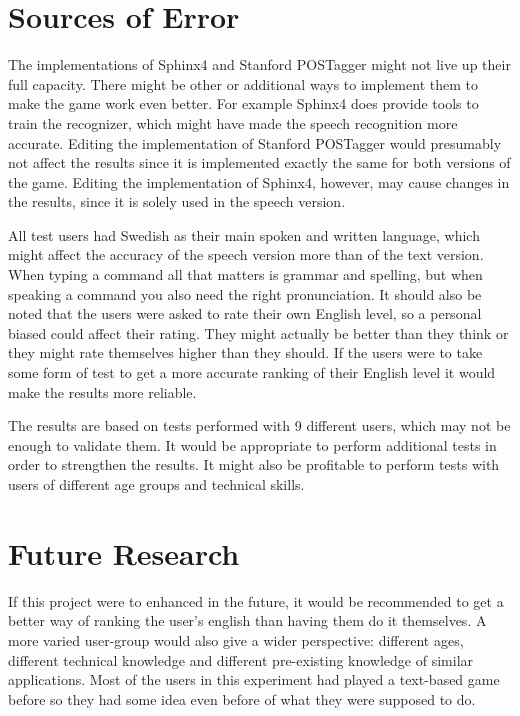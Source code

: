 \section{Sources of Error} %
The implementations of Sphinx4 and Stanford POSTagger might not live up their full capacity. There might be other or additional ways to implement them to make the game work even better. For example Sphinx4 does provide tools to train the recognizer, which might have made the speech recognition more accurate. Editing the implementation of Stanford POSTagger would presumably not affect the results since it is implemented exactly the same for both versions of the game. Editing the implementation of Sphinx4, however, may cause changes in the results, since it is solely used in the speech version.

All test users had Swedish as their main spoken and written language, which might affect the accuracy of the speech version more than of the text version. When typing a command all that matters is grammar and spelling, but when speaking a command you also need the right pronunciation. It should also be noted that the users were asked to rate their own English level, so a personal biased could affect their rating. They might actually be better than they think or they might rate themselves higher than they should. If the users were to take some form of test to get a more accurate ranking of their English level it would make the results more reliable.

The results are based on tests performed with 9 different users, which may not be enough to validate them. It would be appropriate to perform additional tests in order to strengthen the results. It might also be profitable to perform tests with users of different age groups and technical skills.

\section{Future Research}
If this project were to enhanced in the future, it would be recommended to get a better way of ranking the user's english than having them do it themselves. A more varied user-group would also give a wider perspective: different ages, different technical knowledge and different pre-existing knowledge of similar applications. Most of the users in this experiment had played a text-based game before so they had some idea even before of what they were supposed to do.